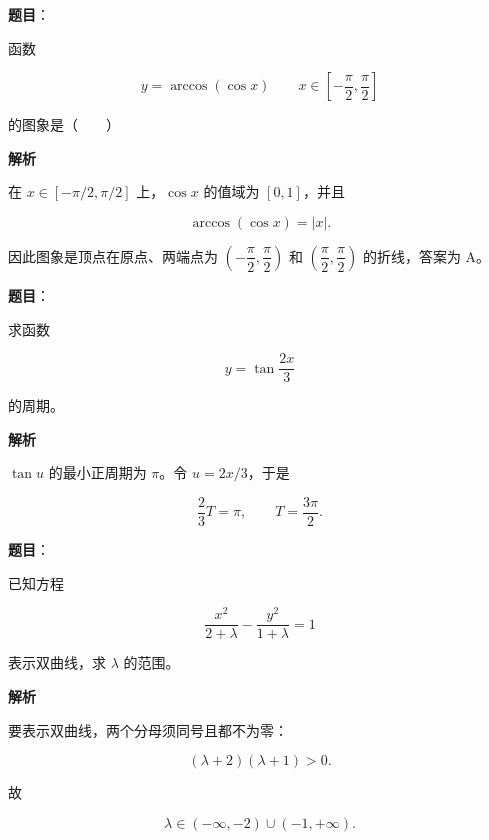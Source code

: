\begin{answer}

\textbf{题目}：

函数

\nopagebreak[4]
\[
y=\arccos(\cos x)\qquad x\in\left[-\frac\pi2,\frac\pi2\right]
\]

的图象是\mbox{（　　）}
\nopagebreak[4]
\begin{center}\end{center}
\nopagebreak[4]
\textbf{解析}

在 $x\in[-\pi/2,\pi/2]$ 上，$\cos x$ 的值域为 $[0,1]$，并且

\nopagebreak[4]
\[
\arccos(\cos x)=|x|.
\]

因此图象是顶点在原点、两端点为 $\left(-\dfrac\pi2,\dfrac\pi2\right)$ 和 $\left(\dfrac\pi2,\dfrac\pi2\right)$ 的折线，答案为 A。


\end{answer}
\begin{answer}

\textbf{题目}：

求函数

\nopagebreak[4]
\[
y=\tan\frac{2x}{3}
\]

的周期。

\textbf{解析}

$\tan u$ 的最小正周期为 $\pi$。令 $u=2x/3$，于是

\nopagebreak[4]
\[
\frac23T=\pi,
\qquad
T=\frac{3\pi}{2}.
\]


\end{answer}
\begin{answer}

\textbf{题目}：

已知方程

\nopagebreak[4]
\[
\frac{x^2}{2+\lambda}-\frac{y^2}{1+\lambda}=1
\]

表示双曲线，求 $\lambda$ 的范围。

\textbf{解析}

要表示双曲线，两个分母须同号且都不为零：

\nopagebreak[4]
\[
(\lambda+2)(\lambda+1)>0.
\]

故

\nopagebreak[4]
\[
\lambda\in(-\infty,-2)\cup(-1,+\infty).
\]


\end{answer}
